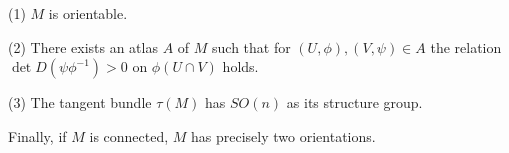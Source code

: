 (1) $M$ is orientable.

(2) There exists an atlas $A$ of $M$ such that for $(U, \phi), (V, \psi) \in A$ the relation $\det D(\psi \phi^{-1}) > 0$ on $\phi(U \cap V)$ holds.

(3) The tangent bundle $\tau(M)$ has $SO(n)$ as its structure group.

Finally, if $M$ is connected, $M$ has precisely two orientations.
